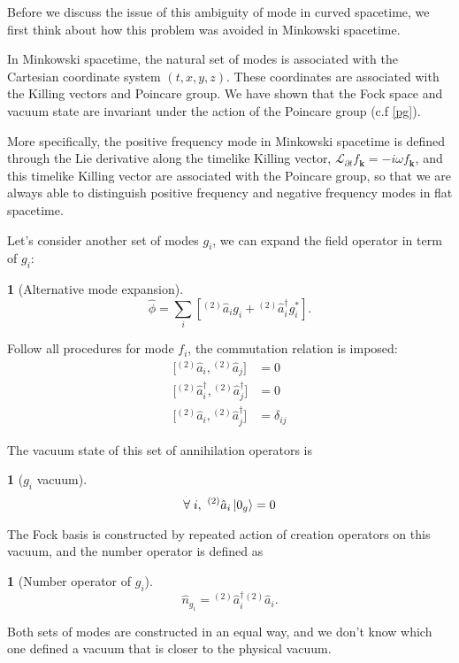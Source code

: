 \documentclass[12pt]{article}
\numberwithin{equation}{section}
\theoremstyle{1style}
\newtheorem{cthm}[equation]{}
\newcommand{\p}{\partial}
\begin{document}
Before we discuss the issue of this ambiguity of mode in curved spacetime,
we first think about how this problem was avoided in Minkowski spacetime.

In Minkowski spacetime, the natural set of modes is associated with the Cartesian coordinate system \((t,x,y,z)\).
These coordinates are associated with the Killing vectors and Poincare group.
We have shown that the Fock space and vacuum state are invariant under the action of the Poincare group (c.f \ref{pg}).

More specifically, the positive frequency mode in Minkowski spacetime is defined through the Lie derivative along the
timelike Killing vector, \(\mathcal{L}_{\p t}f_{\mathbf{k}}=-i\omega f_{\mathbf{k}}\), and this timelike Killing vector
are associated with the Poincare group, so that we are always able to distinguish positive frequency and negative frequency modes in
flat spacetime.

Let's consider another set of modes \(g_i\), we can expand the field operator in term of \(g_i\):
\begin{cthm}[Alternative mode expansion]\label{ame}
  \[\hat{\phi}=\sum_i\left[{}^{(2)}\hat{{a}}_i g_i+{}^{(2)}\hat{{a}}_i^\dagger g_i^*\right].\]
\end{cthm}
Follow all procedures for mode \(f_i\), the commutation relation is imposed:
\begin{align}
  \bigl[{}^{(2)}\hat{{a}}_{i},{}^{(2)}\hat{{a}}_{j}\bigr]                     & =0           \\
  \bigl[{}^{(2)}\hat{{a}}^{\dagger}_{i},{}^{(2)}\hat{{a}}^{\dagger}_{j}\bigr] & =0           \\
  \bigl[{}^{(2)}\hat{{a}}_{i},{}^{(2)}\hat{{a}}^{\dagger}_{j}\bigr]           & =\delta_{ij}
\end{align}

The vacuum state of this set of annihilation operators is
\begin{cthm}[\(g_i\) vacuum]
  \[\forall\;i,\ {}^{(2)}\hat{{a}}_i\ket{0_g}=0\]
\end{cthm}
The Fock basis is constructed by repeated action of creation operators on this vacuum, and the number operator is defined as
\begin{cthm}[Number operator of \(g_i\)]
  \[\hat{n}_{g_i}={}^{(2)}\hat{{a}}_i^\dagger {}^{(2)}\hat{{a}}_i.\]
\end{cthm}

Both sets of modes are constructed in an equal way, and we don't know which one defined a vacuum that is closer to the physical vacuum.
\end{document}
